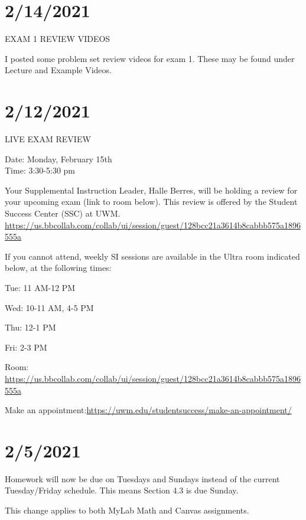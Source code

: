 \documentclass[]{article}
\begin{document}
	
\section*{2/14/2021}
EXAM 1 REVIEW VIDEOS

I posted some problem set review videos for exam 1. These may be found under Lecture and Example Videos.
	
\section*{2/12/2021}
LIVE EXAM REVIEW

Date: Monday, February 15th \\
Time: 3:30-5:30 pm

Your Supplemental Instruction Leader, Halle Berres, will be holding a review for your upcoming exam (link to room below). This review is offered by the Student Success Center (SSC) at UWM. \url{https://us.bbcollab.com/collab/ui/session/guest/128bcc21a3614b8cabbb575a1896555a}

If you cannot attend, weekly SI sessions are available in the Ultra room indicated below, at the following times: 

Tue: 11 AM-12 PM

Wed: 10-11 AM, 4-5 PM

Thu: 12-1 PM

Fri: 2-3 PM

Room: \url{https://us.bbcollab.com/collab/ui/session/guest/128bcc21a3614b8cabbb575a1896555a}

Make an appointment:\url{https://uwm.edu/studentsuccess/make-an-appointment/}



\section*{2/5/2021}
Homework will now be due on Tuesdays and Sundays instead of the current Tuesday/Friday schedule. This means Section 4.3 is due Sunday.

This change applies to both MyLab Math and Canvas assignments.
\end{document}
